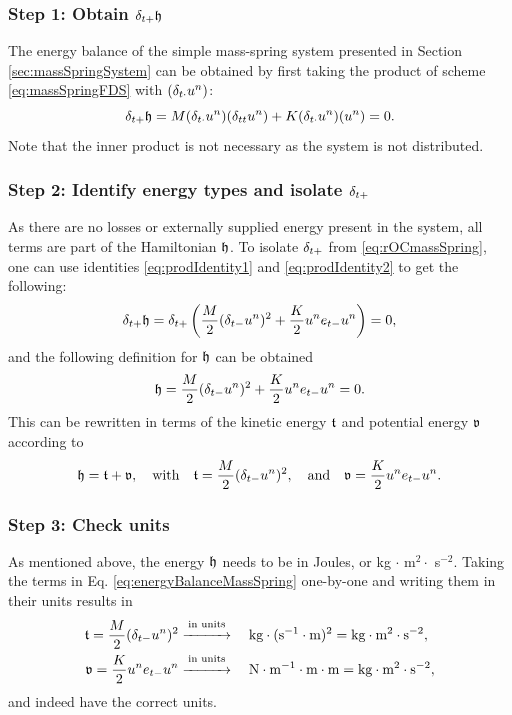 {{\subsubsection{Step 1: Obtain $\delta_{t+} \mathfrak{h}$}
The energy balance of the simple mass-spring system presented in Section \ref{sec:massSpringSystem} can be obtained by first taking the product of scheme \eqref{eq:massSpringFDS} with $(\delta_{t\cdot} u^n)$:
\begin{equation}\label{eq:rOCmassSpring}
    \delta_{t+} \mathfrak{h} = M(\delta_{t\cdot}u^n)(\delta_{tt} u^n) + K(\delta_{t\cdot}u^n)(u^n) = 0.
\end{equation}
Note that the inner product is not necessary as the system is not distributed.

\subsubsection{Step 2: Identify energy types and isolate $\delta_{t+}$}
As there are no losses or externally supplied energy present in the system, all terms are part of the Hamiltonian $\mathfrak{h}$. To isolate $\delta_{t+}$ from \eqref{eq:rOCmassSpring}, one can use identities \eqref{eq:prodIdentity1} and \eqref{eq:prodIdentity2} to get the following:
\begin{equation}
    \delta_{t+} \mathfrak{h} = \delta_{t+}\left(\frac{M}{2}(\delta_{t-}u^n)^2 + \frac{K}{2}u^n e_{t-}u^n\right) = 0,
\end{equation}
and the following definition for $\mathfrak{h}$ can be obtained
\begin{equation}
    \mathfrak{h} = \frac{M}{2}(\delta_{t-}u^n)^2 + \frac{K}{2}u^n e_{t-}u^n = 0.
\end{equation}
This can be rewritten in terms of the kinetic energy $\mathfrak{t}$ and potential energy $\mathfrak{v}$ according to
\begin{equation}\label{eq:energyBalanceMassSpring}
    \mathfrak{h} = \mathfrak{t} + \mathfrak{v}, \quad \text{with} \quad
    \mathfrak{t} = \frac{M}{2}(\delta_{t-}u^n)^2, \quad \text{and} \quad \mathfrak{v} = \frac{K}{2}u^n e_{t-}u^n.
\end{equation} 

\subsubsection{Step 3: Check units}
As mentioned above, the energy $\mathfrak{h}$ needs to be in Joules, or kg $\cdot$ m$^2 \cdot$ s$^{-2}$. Taking the terms in Eq. \eqref{eq:energyBalanceMassSpring} one-by-one and writing them in their units results in 
\begin{align*}
    \mathfrak{t} = \frac{M}{2}(\delta_{t-}u^n)^2 &\overset{\text{in units}}{\xrightarrow{\hspace*{1cm}}} \quad\text{kg}\cdot(\text{s}^{-1}\cdot \text{m})^{2}= \text{kg}\cdot\text{m}^2\cdot\text{s}^{-2},\\
    \mathfrak{v} = \frac{K}{2}u^n e_{t-}u^n&\overset{\text{in units}}{\xrightarrow{\hspace*{1cm}}} \quad \text{N} \cdot \text{m}^{-1} \cdot \text{m}\cdot \text{m} = \text{kg}\cdot\text{m}^2\cdot\text{s}^{-2},
\end{align*}
and indeed have the correct units. 

}}
